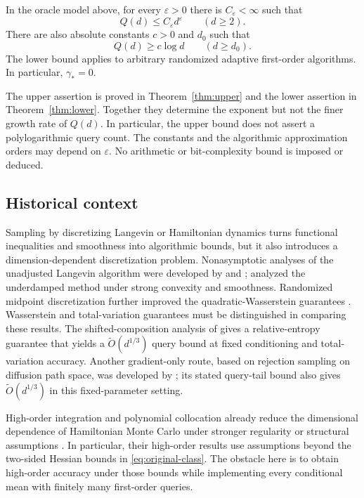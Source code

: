 \begin{theorem}\label{thm:main}
In the oracle model above, for every \(\varepsilon>0\)
there is \(C_\varepsilon<\infty\) such that
\[
                  Q(d)\le C_\varepsilon d^\varepsilon
                  \qquad(d\ge2).
\]
There are also absolute constants \(c>0\) and \(d_0\)
such that
\[
                  Q(d)\ge c\log d\qquad(d\ge d_0).
\]
The lower bound applies to arbitrary randomized adaptive
first-order algorithms. In particular, \(\gamma_*=0\).
\end{theorem}

The upper assertion is proved in Theorem~\ref{thm:upper}
and the lower assertion in Theorem~\ref{thm:lower}.
Together they determine the exponent but not the finer
growth rate of \(Q(d)\). In particular, the upper bound
does not assert a polylogarithmic query count.
The constants and the algorithmic approximation orders
may depend on \(\varepsilon\). No arithmetic or
bit-complexity bound is imposed or deduced.

\subsection{Historical context}

Sampling by discretizing Langevin or Hamiltonian dynamics turns
functional inequalities and smoothness into algorithmic bounds, but it
also introduces a dimension-dependent discretization problem.
Nonasymptotic analyses of the unadjusted Langevin algorithm were developed
by \citet{dalalyan2017langevin} and \citet{durmus2017langevin};
\citet{cheng2018underdamped} analyzed the underdamped method under strong
convexity and smoothness. Randomized midpoint discretization further
improved the quadratic-Wasserstein guarantees
\citep{shen2019randomized}. Wasserstein and total-variation guarantees
must be distinguished in comparing these results.
The shifted-composition analysis of
\citet[Theorem~5.6]{altschuler2026shifted} gives a relative-entropy
guarantee that yields a \(\widetilde O(d^{1/3})\) query bound at fixed
conditioning and total-variation accuracy. Another gradient-only route,
based on rejection sampling on diffusion path space, was developed by
\citet[Theorem~3.2(ii)]{chen2026exact}; its stated query-tail bound also
gives \(\widetilde O(d^{1/3})\) in this fixed-parameter setting.

High-order integration and polynomial collocation already reduce the
dimensional dependence of Hamiltonian Monte Carlo under stronger
regularity or structural assumptions
\citep{mangoubi2017rapid,lee2018odes}. In particular, their high-order
results use assumptions beyond the two-sided Hessian bounds in
\eqref{eq:original-class}. The obstacle here is to obtain high-order
accuracy under those bounds while implementing every conditional mean
with finitely many first-order queries.

